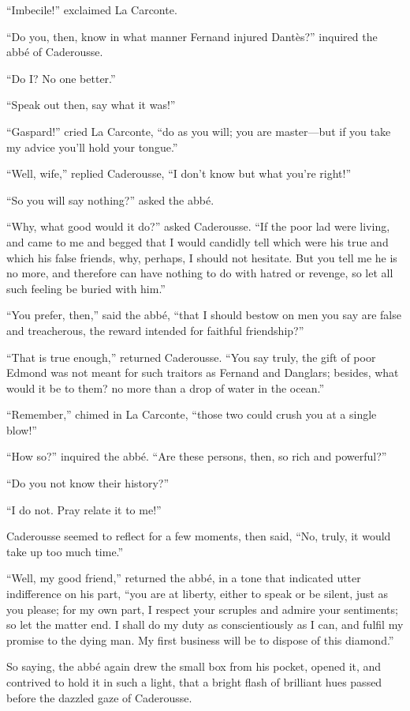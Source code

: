 “Imbecile!” exclaimed La Carconte.

“Do you, then, know in what manner Fernand injured Dantès?” inquired
the abbé of Caderousse.

“Do I? No one better.”

“Speak out then, say what it was!”

“Gaspard!” cried La Carconte, “do as you will; you are master—but if
you take my advice you’ll hold your tongue.”

“Well, wife,” replied Caderousse, “I don’t know but what you’re right!”

“So you will say nothing?” asked the abbé.

“Why, what good would it do?” asked Caderousse. “If the poor lad were
living, and came to me and begged that I would candidly tell which were
his true and which his false friends, why, perhaps, I should not
hesitate. But you tell me he is no more, and therefore can have nothing
to do with hatred or revenge, so let all such feeling be buried with
him.”

“You prefer, then,” said the abbé, “that I should bestow on men you say
are false and treacherous, the reward intended for faithful
friendship?”

“That is true enough,” returned Caderousse. “You say truly, the gift of
poor Edmond was not meant for such traitors as Fernand and Danglars;
besides, what would it be to them? no more than a drop of water in the
ocean.”

“Remember,” chimed in La Carconte, “those two could crush you at a
single blow!”

“How so?” inquired the abbé. “Are these persons, then, so rich and
powerful?”

“Do you not know their history?”

“I do not. Pray relate it to me!”

Caderousse seemed to reflect for a few moments, then said, “No, truly,
it would take up too much time.”

“Well, my good friend,” returned the abbé, in a tone that indicated
utter indifference on his part, “you are at liberty, either to speak or
be silent, just as you please; for my own part, I respect your scruples
and admire your sentiments; so let the matter end. I shall do my duty
as conscientiously as I can, and fulfil my promise to the dying man. My
first business will be to dispose of this diamond.”

So saying, the abbé again drew the small box from his pocket, opened
it, and contrived to hold it in such a light, that a bright flash of
brilliant hues passed before the dazzled gaze of Caderousse.

